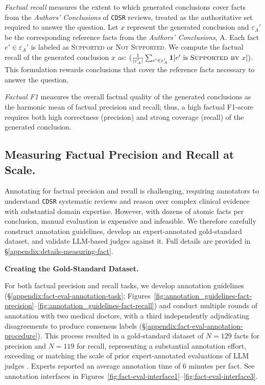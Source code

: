 \documentclass{article}
\newcommand{\xhdr}[1]{%
  \noindent\textbf{#1.}
}
\begin{document}
\textit{Factual recall} measures the extent to which generated conclusions cover facts from the \textit{Authors’ Conclusions} of \texttt{CDSR} reviews, treated as the authoritative set required to answer the question. Let $x$ represent the generated conclusion and $\varepsilon_A'$ be the corresponding reference facts from the \textit{Authors’ Conclusions}, A. Each fact $e' \in \varepsilon_A'$ is labeled as \textsc{Supported} or \textsc{Not Supported}. We compute the factual recall of the generated conclusion $x$ as: $(\frac{1}{|\varepsilon_A'|} \sum_{e' \in \varepsilon_A'} \mathbf{1}[e' \text{ is } \textsc{Supported by } x])$. This formulation rewards conclusions that cover the reference facts necessary to answer the question.

\textit{Factual F1} measures the overall factual quality of the generated conclusions as the harmonic mean of factual precision and recall; thus, a high factual F1-score requires both high correctness (precision) and strong coverage (recall) of the generated conclusion.



\subsection{Measuring Factual Precision and Recall at Scale.}\label{sec:factual-llm-judge}

Annotating for factual precision and recall is challenging, requiring annotators to understand \texttt{CDSR} systematic reviews and reason over complex clinical evidence with substantial domain expertise. However, with dozens of atomic facts per conclusion, manual evaluation is expensive and infeasible. We therefore carefully construct annotation guidelines, develop an expert-annotated gold-standard dataset, and validate LLM-based judges against it. Full details are provided in \S\ref{appendix:details-measuring-fact}.

\xhdr{Creating the Gold-Standard Dataset} 
For both factual precision and recall tasks, we develop annotation guidelines (\S\ref{appendix:fact-eval-annotation-task};  Figures~\ref{fig:annotation_guidelines-fact-precision}--\ref{fig:annotation_guidelines-fact-recall}) and conduct multiple rounds of annotation with two medical doctors, with a third independently adjudicating disagreements to produce consensus labels (\S\ref{appendix:fact-eval-annotation-procedure}). 
This process resulted in a gold-standard dataset of $N=129$ facts for precision and $N=119$ for recall, representing a substantial annotation effort, exceeding or matching the scale of prior expert-annotated evaluations of LLM judges \cite{cheng2025facts, 10.1093/jla/laae003, dammu-etal-2024-uncultured, jung-etal-2025-mythtriage, phutane2025ableistintersectionaldisabilitybias}. Experts reported an average annotation time of 6 minutes per fact. See annotation interfaces in Figures~\ref{fig:fact-eval-interface1}--\ref{fig:fact-eval-interface3}.
\end{document}
